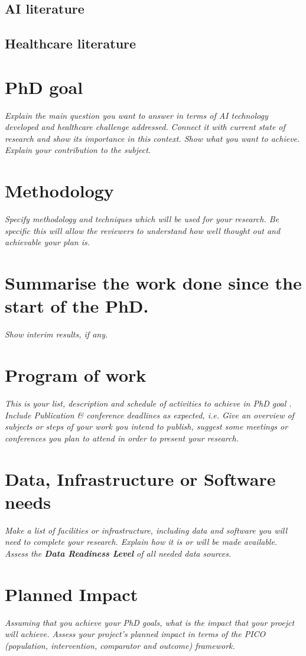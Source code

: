 \subsection{AI literature}
\subsection{Healthcare literature}
\section{PhD goal}
\emph{Explain the main question you want to answer in terms of AI technology developed and healthcare challenge addressed. Connect it with current state of research and show its importance in this context.
Show what you want to achieve. Explain your contribution to the subject.}

\section{Methodology}
\emph{Specify methodology and techniques which will be used for your research. Be specific this will allow the reviewers to understand how well thought out and achievable your plan is.}
\section{Summarise the work done since the start of the PhD.}
\emph{Show interim results, if any.}
\section{Program of work}
\emph{This is your list, description and schedule of activities to achieve in PhD goal . Include Publication \& conference deadlines as expected, i.e. Give an overview of subjects or steps of your work you intend to publish,  suggest some meetings or conferences you plan to attend in order to present your research.}

\section{Data, Infrastructure or Software needs}
\emph{Make a list of facilities or infrastructure, including data and software you will need to complete your research. Explain how it is or will be made available. Assess the \textbf{Data Readiness Level} of all needed data sources.}

\section{Planned Impact}
\emph{Assuming that you achieve your PhD goals, what is the impact that your proejct will achieve. Assess your project's planned impact in terms of the PICO (population, intervention, comparator and outcome) framework.}

